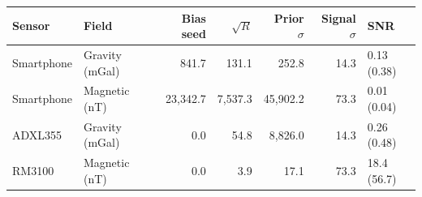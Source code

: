 \begin{tabular}{llrrrrl}
\toprule
Sensor & Field & Bias seed & \(\sqrt{R}\) & Prior \(\sigma\) & Signal \(\sigma\) & SNR \\
\midrule
Smartphone & Gravity (mGal) & 841.7 & 131.1 & 252.8 & 14.3 & 0.13 (0.38) \\
Smartphone & Magnetic (nT) & 23{,}342.7 & 7{,}537.3 & 45{,}902.2 & 73.3 & 0.01 (0.04) \\
\midrule
ADXL355 & Gravity (mGal) & 0.0 & 54.8 & 8{,}826.0 & 14.3 & 0.26 (0.48) \\
RM3100 & Magnetic (nT) & 0.0 & 3.9 & 17.1 & 73.3 & 18.4 (56.7) \\
\bottomrule
\end{tabular}
